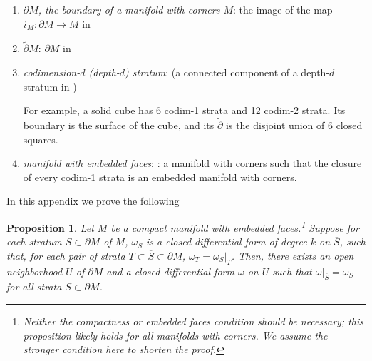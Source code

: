 \documentclass[11pt]{article}
\newtheorem{prp}[thm]{Proposition}
\theoremstyle{definition}
\newtheorem{dfn}[thm]{Definition}
\theoremstyle{remark}
\def\ov#1{\overline{#1}}
\def\Z{\mathbb{Z}}
\def\R{\mathbb{R}}
\begin{document}
\begin{appendices}
\begin{enumerate}[label=$\cdot$]
\item {\it $\partial M$, the boundary of a manifold with corners $M$}: the image of the map $i_M:\partial M\to M$ in \cite[Definition 2.6]{Joyce}

\item $\tilde\partial M$: $\partial M$ in \cite[Definition 2.6]{Joyce}

\item {\it codimension-$d$ (depth-$d$) stratum}: \cite[Definition 7]{Hajek} (a connected component of a depth-$d$ stratum in \cite[Definition 2.3]{Joyce})

For example, a solid cube has 6 codim-1 strata and 12 codim-2 strata. Its boundary is the surface of the cube, and its $\tilde\partial$ is the disjoint union of 6 closed squares. 

\item {\it manifold with embedded faces}: \cite[Definition 18]{Hajek}: a manifold with corners such that the closure of every codim-1 strata is an embedded manifold with corners. 
\end{enumerate}



In this appendix we prove the following 
\begin{prp}\label{formextension_prp}
Let $M$ be a compact manifold with embedded faces.\footnote{Neither the compactness or embedded faces condition should be necessary; this proposition likely holds for all manifolds with corners. We assume the stronger condition here to shorten the proof.} 
Suppose for each stratum $S\subset\partial M$ of $M$, $\omega_S$ is a closed differential form of degree $k$ on $\ov{S}$, such that, for each pair of strata $T\subset \ov{S} \subset\partial{M}$, $\omega_T=\omega_S|_{\ov{T}}$. 
Then, there exists an open neighborhood $U$ of $\partial M$ and a closed differential form $\omega$ on $U$ such that $\omega|_{\ov{S}}=\omega_S$ for all strata $S\subset\partial M$. 
\end{prp}


\end{appendices}
\end{document}

